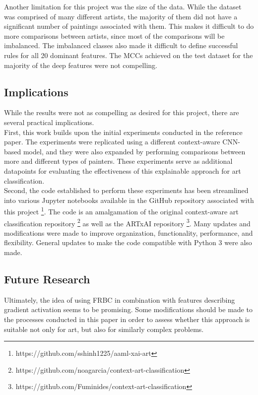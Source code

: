 \documentclass{article}
\begin{document}
Another limitation for this project was the size of the data. While the dataset was comprised of many different artists, the majority of them did not have a significant number of paintings associated with them. This makes it difficult to do more comparisons between artists, since most of the comparisons will be imbalanced. The imbalanced classes also made it difficult to define successful rules for all 20 dominant features. The MCCs achieved on the test dataset for the majority of the deep features were not compelling.

\subsection{Implications}

While the results were not as compelling as desired for this project, there are several practical implications. \\

First, this work builds upon the initial experiments conducted in the reference paper. The experiments were replicated using a different context-aware CNN-based model, and they were also expanded by performing comparisons between more and different types of painters. These experiments serve as additional datapoints for evaluating the effectiveness of this explainable approach for art classification. \\

Second, the code established to perform these experiments has been streamlined into various Jupyter notebooks available in the GitHub repository associated with this project \footnote{https://github.com/sshinh1225/aaml-xai-art}. The code is an amalgamation of the original context-aware art classification repository \footnote{https://github.com/noagarcia/context-art-classification} as well as the ARTxAI repository \footnote{https://github.com/Fuminides/context-art-classification}. Many updates and modifications were made to improve organization, functionality, performance, and flexibility. General updates to make the code compatible with Python 3 were also made.

\subsection{Future Research}
Ultimately, the idea of using FRBC in combination with features describing gradient activation seems to be promising. Some modifications should be made to the processes conducted in this paper in order to assess whether this approach is suitable not only for art, but also for similarly complex problems. \\
\end{document}
